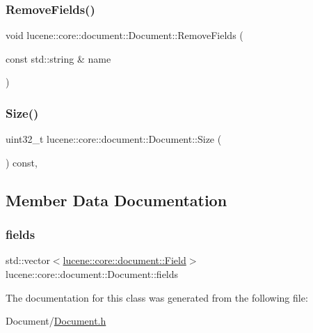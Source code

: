 \subsubsection{\texorpdfstring{Remove\+Fields()}{RemoveFields()}}
{\footnotesize\ttfamily void lucene\+::core\+::document\+::\+Document\+::\+Remove\+Fields (\begin{DoxyParamCaption}\item[{const std\+::string \&}]{name }\end{DoxyParamCaption})\hspace{0.3cm}{\ttfamily [inline]}}

\mbox{\label{classlucene_1_1core_1_1document_1_1Document_ad1556e7f0c71a2f347850d6d40392b0c}} 
\subsubsection{\texorpdfstring{Size()}{Size()}}
{\footnotesize\ttfamily uint32\+\_\+t lucene\+::core\+::document\+::\+Document\+::\+Size (\begin{DoxyParamCaption}{ }\end{DoxyParamCaption}) const\hspace{0.3cm}{\ttfamily [inline]}, {\ttfamily [noexcept]}}



\subsection{Member Data Documentation}
\mbox{\label{classlucene_1_1core_1_1document_1_1Document_af9530ebe88523c7b14063d7efeccf987}} 
\subsubsection{\texorpdfstring{fields}{fields}}
{\footnotesize\ttfamily std\+::vector$<$\mbox{\hyperlink{classlucene_1_1core_1_1document_1_1Field}{lucene\+::core\+::document\+::\+Field}}$>$ lucene\+::core\+::document\+::\+Document\+::fields\hspace{0.3cm}{\ttfamily [private]}}



The documentation for this class was generated from the following file\+:\begin{DoxyCompactItemize}
\item 
Document/\mbox{\hyperlink{Document_8h}{Document.\+h}}\end{DoxyCompactItemize}
